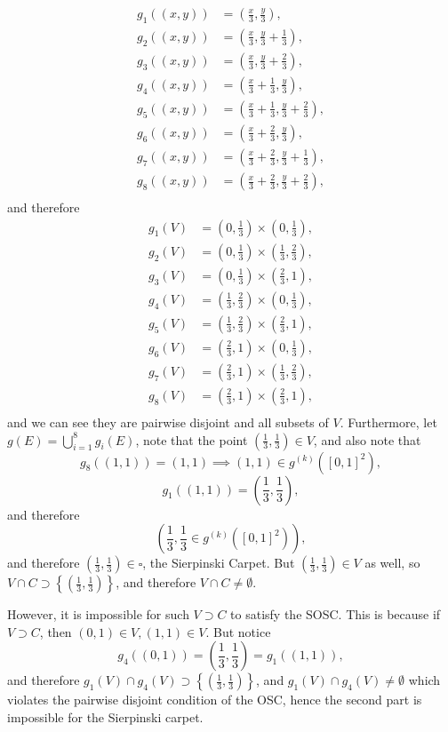 \begin{align*}
    g_1((x, y)) &= \left(\frac{x}{3}, \frac{y}{3}\right),\\
    g_2((x, y)) &= \left(\frac{x}{3}, \frac{y}{3} + \frac{1}{3}\right),\\
    g_3((x, y)) &= \left(\frac{x}{3}, \frac{y}{3} + \frac{2}{3}\right),\\
    g_4((x, y)) &= \left(\frac{x}{3} + \frac{1}{3}, \frac{y}{3}\right),\\
    g_5((x, y)) &= \left(\frac{x}{3} + \frac{1}{3}, \frac{y}{3} + \frac{2}{3}\right),\\
    g_6((x, y)) &= \left(\frac{x}{3} + \frac{2}{3}, \frac{y}{3}\right),\\
    g_7((x, y)) &= \left(\frac{x}{3} + \frac{2}{3}, \frac{y}{3} + \frac{1}{3}\right),\\
    g_8((x, y)) &= \left(\frac{x}{3} + \frac{2}{3}, \frac{y}{3} + \frac{2}{3}\right),\\
\end{align*}
and therefore
\begin{align*}
    g_1(V) &= \left(0, \frac{1}{3}\right) \times \left(0, \frac{1}{3}\right),\\
    g_2(V) &= \left(0, \frac{1}{3}\right) \times \left(\frac{1}{3}, \frac{2}{3}\right),\\
    g_3(V) &= \left(0, \frac{1}{3}\right) \times \left(\frac{2}{3}, 1\right),\\
    g_4(V) &= \left(\frac{1}{3}, \frac{2}{3}\right) \times \left(0, \frac{1}{3}\right),\\
    g_5(V) &= \left(\frac{1}{3}, \frac{2}{3}\right) \times \left(\frac{2}{3}, 1\right),\\
    g_6(V) &= \left(\frac{2}{3}, 1\right) \times \left(0, \frac{1}{3}\right),\\
    g_7(V) &= \left(\frac{2}{3}, 1\right) \times \left(\frac{1}{3}, \frac{2}{3}\right),\\
    g_8(V) &= \left(\frac{2}{3}, 1\right) \times \left(\frac{2}{3}, 1\right),\\
\end{align*}
and we can see they are pairwise disjoint and all subsets of \(V\). Furthermore, let \(g(E) = \bigcup_{i = 1}^{8} g_i(E)\), note that the point \(\left(\frac{1}{3}, \frac{1}{3}\right) \in V\), and also note that
\[
g_8((1, 1)) = (1, 1) \implies (1, 1) \in g^{(k)}([0, 1]^2),
\]
\[
g_1((1, 1)) = \left(\frac{1}{3}, \frac{1}{3}\right),
\]
and therefore
\[
\left(\frac{1}{3}, \frac{1}{3} \in g^{(k)}([0, 1]^2)\right),
\]
and therefore \(\left(\frac{1}{3}, \frac{1}{3}\right) \in \square\), the Sierpinski Carpet. But \(\left(\frac{1}{3}, \frac{1}{3}\right) \in V\) as well, so \(V \cap C \supset \left\{\left(\frac{1}{3}, \frac{1}{3}\right)\right\}\), and therefore \(V \cap C \neq \emptyset\).

However, it is impossible for such \(V \supset C\) to satisfy the SOSC. This is because if \(V \supset C\), then \((0, 1) \in V, (1, 1) \in V\). But notice
\[
g_4((0, 1)) = \left(\frac{1}{3}, \frac{1}{3}\right) = g_1((1, 1)),
\]
and therefore \(g_1(V) \cap g_4(V) \supset \left\{\left(\frac{1}{3}, \frac{1}{3}\right)\right\}\), and \(g_1(V) \cap g_4(V) \neq \emptyset\) which violates the pairwise disjoint condition of the OSC, hence the second part is impossible for the Sierpinski carpet.